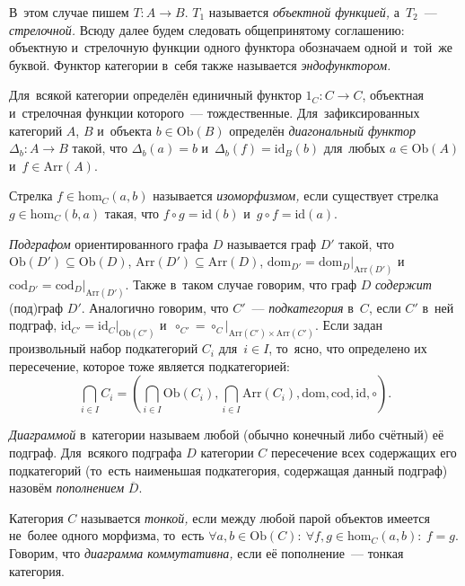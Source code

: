 \documentclass{article}
\begin{document}
В~этом случае пишем $T : A \rightarrow B$. $T_1$ называется \textit{объектной функцией,} а~$T_2$~— \textit{стрелочной.}
Всюду далее будем следовать общепринятому соглашению: объектную и~стрелочную функции одного функтора обозначаем одной и~той~же буквой.
Функтор категории в~себя также называется \textit{эндофунктором.}

Для~всякой категории определён единичный функтор $1_C : C \rightarrow C$, объектная и~стрелочная функции которого~— тождественные.
Для~зафиксированных категорий $A$, $B$ и~объекта $b \in \mathrm{Ob}(B)$ определён \textit{диагональный функтор} $\Delta_b : A \rightarrow B$
такой, что $\Delta_b(a) = b$ и~$\Delta_b(f) = \mathrm{id}_B(b)$ для~любых $a \in \mathrm{Ob}(A)$ и~$f \in \mathrm{Arr}(A)$.

Стрелка $f \in \mathrm{hom}_C(a, b)$ называется \textit{изоморфизмом,} если существует стрелка $g \in \mathrm{hom}_C(b, a)$
такая, что $f \circ g = \mathrm{id}(b)$ и~$g \circ f = \mathrm{id}(a)$.

\textit{Подграфом} ориентированного графа $D$ называется граф $D'$ такой, что $\mathrm{Ob}(D') \subseteq \mathrm{Ob}(D)$, $\mathrm{Arr}(D') \subseteq \mathrm{Arr}(D)$,
$\mathrm{dom}_{D'} = \mathrm{dom}_{D} |_{\mathrm{Arr}(D')}$ и~$\mathrm{cod}_{D'} = \mathrm{cod}_{D} |_{\mathrm{Arr}(D')}$.
Также в~таком случае говорим, что граф $D$ \textit{содержит} (под)граф $D'$.
Аналогично говорим, что $C'$~— \textit{подкатегория} в~$C$, если $C'$ в~ней подграф, $\mathrm{id}_{C'} = \mathrm{id}_{C} |_{\mathrm{Ob}(C')}$
и~$\circ_{C'} = \circ_{C} |_{\mathrm{Arr}(C') \times \mathrm{Arr}(C')}$.
Если задан произвольный набор подкатегорий $C_i$ для~$i \in I$, то~ясно, что определено их пересечение, которое тоже является подкатегорией:
$$
    \bigcap\limits_{i \in I} C_i = \left( \bigcap\limits_{i \in I} \mathrm{Ob}(C_i), \bigcap\limits_{i \in I} \mathrm{Arr}(C_i), \mathrm{dom}, \mathrm{cod}, \mathrm{id}, \circ \right).
$$

\textit{Диаграммой} в~категории называем любой (обычно конечный либо счётный) её подграф.
Для~всякого подграфа $D$ категории $C$ пересечение всех содержащих его подкатегорий
(то~есть наименьшая подкатегория, содержащая данный подграф) назовём \textit{пополнением} $\overline{D}$.

Категория $C$ называется \textit{тонкой,} если между любой парой объектов имеется не~более одного морфизма,
то~есть $\forall a, b \in \mathrm{Ob}(C){:}\ \forall f, g \in \mathrm{hom}_C(a, b){:}\ f = g$.
Говорим, что \textit{диаграмма коммутативна,} если её пополнение~— тонкая категория.
\end{document}
